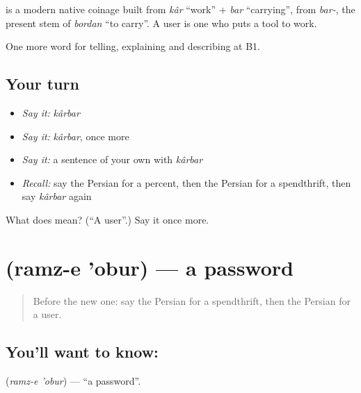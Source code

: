 \begin{cousinweb}
\textbf{} is a modern native coinage built from \emph{kâr} \textquotedblleft{}work\textquotedblright{} + \emph{bar} \textquotedblleft{}carrying\textquotedblright{}, from \emph{bar-}, the present stem of \emph{bordan} \textquotedblleft{}to carry\textquotedblright{}. A user is one who puts a tool to work.
\end{cousinweb}

\begin{grammarlens}[title={What you've built}]
One more word for telling, explaining and describing at B1.
\end{grammarlens}

\subsection*{Your turn}
\begin{itemize}
\raggedright
  \item \emph{Say it:} \emph{kârbar}
  \item \emph{Say it:} \emph{kârbar}, once more
  \item \emph{Say it:} a sentence of your own with \emph{kârbar}
  \item \emph{Recall:} say the Persian for a percent, then the Persian for a spendthrift, then say \emph{kârbar} again
\end{itemize}

\begin{tcolorbox}[breakable,colback=teal!4,colframe=teal!35!black,title={Before you move on}]
What does  mean? (\textquotedblleft{}A user\textquotedblright{}.) Say it once more.
\end{tcolorbox}
\section[\texorpdfstring{\fa{رمز} \fa{عبور} (ramz-e 'obur)}{رمز عبور (ramz-e 'obur)}]{  (ramz-e 'obur) — a password}

\label{lesson:FA-C416-ramz-e-obur}



\begin{quote}
Before the new one: say the Persian for a spendthrift, then the Persian for a user.
\end{quote}

\subsection*{You'll want to know:  }
\textbf{ } (\emph{ramz-e 'obur}) — \textquotedblleft{}a password\textquotedblright{}.

